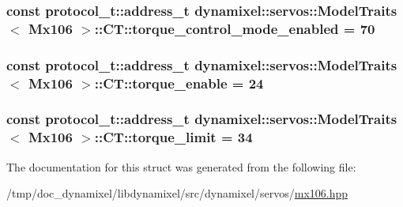 \subsubsection[{\texorpdfstring{torque\+\_\+control\+\_\+mode\+\_\+enabled}{torque_control_mode_enabled}}]{\setlength{\rightskip}{0pt plus 5cm}const {\bf protocol\+\_\+t\+::address\+\_\+t} {\bf dynamixel\+::servos\+::\+Model\+Traits}$<$ {\bf Mx106} $>$\+::C\+T\+::torque\+\_\+control\+\_\+mode\+\_\+enabled = 70\hspace{0.3cm}{\ttfamily [static]}}\hypertarget{structdynamixel_1_1servos_1_1_model_traits_3_01_mx106_01_4_1_1_c_t_a15618c19842b4c285b5ca23348ba0fb2}{}\label{structdynamixel_1_1servos_1_1_model_traits_3_01_mx106_01_4_1_1_c_t_a15618c19842b4c285b5ca23348ba0fb2}
\subsubsection[{\texorpdfstring{torque\+\_\+enable}{torque_enable}}]{\setlength{\rightskip}{0pt plus 5cm}const {\bf protocol\+\_\+t\+::address\+\_\+t} {\bf dynamixel\+::servos\+::\+Model\+Traits}$<$ {\bf Mx106} $>$\+::C\+T\+::torque\+\_\+enable = 24\hspace{0.3cm}{\ttfamily [static]}}\hypertarget{structdynamixel_1_1servos_1_1_model_traits_3_01_mx106_01_4_1_1_c_t_a91582754caa26c05515062cb6336cb6f}{}\label{structdynamixel_1_1servos_1_1_model_traits_3_01_mx106_01_4_1_1_c_t_a91582754caa26c05515062cb6336cb6f}
\subsubsection[{\texorpdfstring{torque\+\_\+limit}{torque_limit}}]{\setlength{\rightskip}{0pt plus 5cm}const {\bf protocol\+\_\+t\+::address\+\_\+t} {\bf dynamixel\+::servos\+::\+Model\+Traits}$<$ {\bf Mx106} $>$\+::C\+T\+::torque\+\_\+limit = 34\hspace{0.3cm}{\ttfamily [static]}}\hypertarget{structdynamixel_1_1servos_1_1_model_traits_3_01_mx106_01_4_1_1_c_t_abb6d4c8767d196077837d53bdb93da3e}{}\label{structdynamixel_1_1servos_1_1_model_traits_3_01_mx106_01_4_1_1_c_t_abb6d4c8767d196077837d53bdb93da3e}


The documentation for this struct was generated from the following file\+:\begin{DoxyCompactItemize}
\item 
/tmp/doc\+\_\+dynamixel/libdynamixel/src/dynamixel/servos/\hyperlink{mx106_8hpp}{mx106.\+hpp}\end{DoxyCompactItemize}
